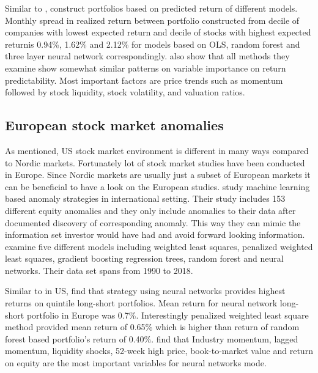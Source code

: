 \documentclass[12pt]{article}
\begin{document}

Similar to \citet{Lewellen2015}, \citeauthor{guetal} construct portfolios based on predicted return of different models. Monthly spread in realized return between portfolio constructed from decile of companies with lowest expected return and decile of stocks with highest expected return\footnotemark is 0.94\%, 1.62\% and 2.12\% for models based on OLS, random forest and three layer neural network correspondingly. \citeauthor{guetal} also show that all methods they examine show somewhat similar patterns on variable importance on return predictability. Most important factors are price trends such as momentum followed by stock liquidity, stock volatility, and valuation ratios. \par


\subsection{European stock market anomalies}\label{EuropeanStockMarketAnomalies}

As mentioned, US stock market environment is different in many ways compared to Nordic markets. Fortunately lot of stock market studies have been conducted in Europe. Since Nordic markets are usually just a subset of European markets it can be beneficial to have a look on the European studies. \citet{TOBEK2021100588} study machine learning based anomaly strategies in international setting. Their study includes 153 different equity anomalies and they only include anomalies to their data after documented discovery of corresponding anomaly. This way they can mimic the information set investor would have had and avoid forward looking information. \citeauthor{TOBEK2021100588} examine five different models including weighted least squares, penalized weighted least squares, gradient boosting regression trees, random forest and neural networks. Their data set spans from 1990 to 2018. \par

Similar to \citet{guetal} in US, \citeauthor{TOBEK2021100588} find that strategy using neural networks provides highest returns on quintile long-short portfolios. Mean return for neural network long-short portfolio in Europe was 0.7\%. Interestingly penalized weighted least square method provided mean return of 0.65\% which is higher than return of random forest based portfolio's return of 0.40\%. \citeauthor{TOBEK2021100588} find that Industry momentum, lagged momentum, liquidity shocks, 52-week high price, book-to-market value and return on equity are the most important variables for neural networks mode\footnotemark. \par
\end{document}
